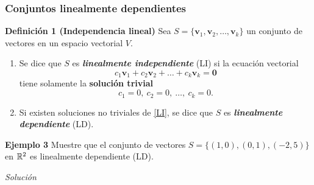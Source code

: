 {\nologo
\begin{frame}\frametitle{Conjuntos linealmente dependientes}

\vspace{-2mm}
\begin{block}{\textbf{Definición 1 (Independencia lineal)}}
	\justifying
	Sea $S=\{\mathbf{v}_1,\mathbf{v}_2,\hdots,\mathbf{v}_k\}$ un conjunto de vectores
	en un espacio vectorial $V$.
	
	\begin{enumerate}%
		\item[\labelname{$a$}] Se dice que $S$ es \textbf{\textit{linealmente independiente}} (LI) si
		la ecuación vectorial
		\begin{equation}\tag{1}
		c_1\mathbf{v}_1+c_2\mathbf{v}_2+\hdots+c_k\mathbf{v}_k = \mathbf{0}
		\end{equation}
		tiene solamente la \textbf{solución trivial}
		\[
		c_1 =0,\ c_2 =0,\ \hdots,\ c_k=0.
		\]
		
		\item[\labelname{$b$}] Si existen soluciones no triviales de \eqref{LI}, se dice que $S$ es \textbf{\textit{linealmente dependiente}} (LD).
	\end{enumerate}		
\end{block}

\begin{ej}{\textbf{Ejemplo 3}} \justifying
	Muestre que el conjunto de vectores $S=\{ (1,0), (0,1), (-2,5) \}$ en $\mathbb{R}^2$ es linealmente dependiente (LD).
\end{ej}	
\textit{Solución}

\end{frame}
}


\subsection{}

